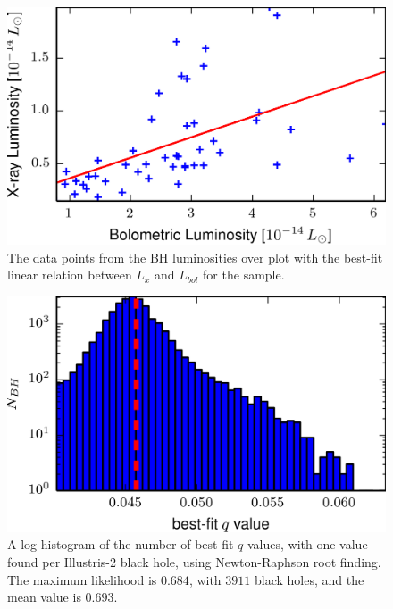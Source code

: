 \begin{figure}
\centering{}\includegraphics[clip]{Figures/elvis_template} \protect\caption{\label{fig:Elvis_template}The data points from the BH luminosities
over plot with the best-fit linear relation between $L_{x}$ and $L_{bol}$
for the sample.}
\end{figure}
\begin{figure}
\begin{centering}
\includegraphics{Figures/q_nr_hist}
\par\end{centering}

\protect\caption{\label{fig:q_nr_hist}A log-histogram of the number of best-fit $q$
values, with one value found per Illustris-2 black hole, using Newton-Raphson
root finding. The maximum likelihood is $0.684$, with $3911$ black holes, and the mean value is $0.693$.}
\end{figure}
